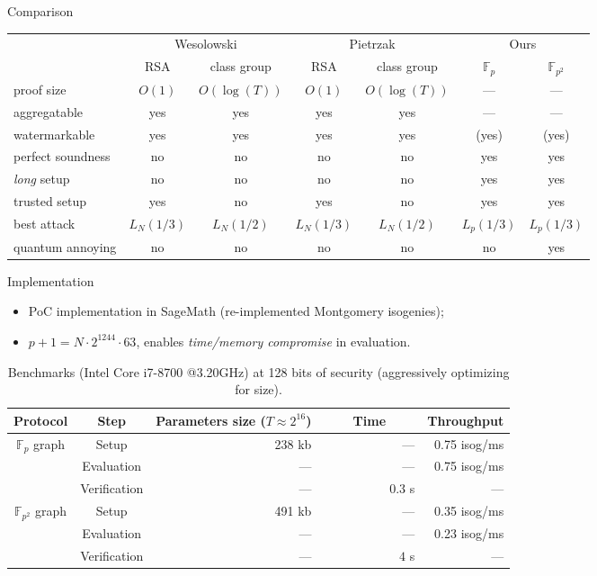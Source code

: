 \documentclass[aspectratio=169]{beamer}
\newcommand{\F}{\mathbb{F}}
\begin{document}
\begin{frame}{Comparison}
  \begin{tabular}{l | c c | c c | c c}
    & \multicolumn{2}{c|}{Wesolowski} & \multicolumn{2}{c|}{Pietrzak} & \multicolumn{2}{c}{Ours}\\
    & RSA & class group & RSA & class group & $\F_p$ & $\F_{p^2}$\\
    \hline
    proof size    & $O(1)$ & $O(\log(T))$ & $O(1)$ & $O(\log(T))$ & --- & ---\\
    aggregatable  & yes & yes & yes & yes & --- & ---\\
    watermarkable & yes & yes & yes & yes & (yes) & (yes)\\
    perfect soundness & no & no & no & no & yes & yes\\
    \textit{long} setup & no & no & no & no & \alert{yes} & \alert{yes}\\
    trusted setup & \alert{yes} & no & \alert{yes} & no & \alert{yes} & \alert{yes}\\
    best attack   & $L_N(1/3)$ & $L_N(1/2)$ & $L_N(1/3)$ & $L_N(1/2)$ & $L_p(1/3)$ & $L_p(1/3)$\\
    quantum annoying & no & no & no & no & no & yes\\
  \end{tabular}
\end{frame}


\begin{frame}{Implementation}
  \begin{itemize}
  \item PoC implementation in SageMath (re-implemented Montgomery isogenies);
  \item \emph{$p+1 = N\cdot 2^{1244}\cdot 63$}, enables
    \emph{time/memory compromise} in evaluation.
  \end{itemize}

  \bigskip
  \begin{table}
    \centering
    \begin{tabular}{c c r r r}
      \textbf{Protocol} & \textbf{Step} & \textbf{Parameters size} ($T\approx 2^{16}$)
      & ~~~~\textbf{Time}~~~~ & \textbf{Throughput}	\\
      \hline
      \multirow{3}{*}{$\F_p$ graph} & Setup & 238 kb & --- & 0.75 isog/ms\\
      & Evaluation & --- &  --- & 0.75 isog/ms\\
      & Verification & --- & $0.3$ s & ---\\
      \hline
      \multirow{3}{*}{$\F_{p^2}$ graph} & Setup & 491 kb & --- & 0.35 isog/ms\\
      & Evaluation & --- &  --- & 0.23 isog/ms\\
      & Verification & --- & $4$ s & ---\\
    \end{tabular}
    
    \caption{Benchmarks (Intel Core i7-8700 @3.20GHz) at 128 bits of
      security (aggressively optimizing for size).}
  \end{table}
\end{frame}
\end{document}
